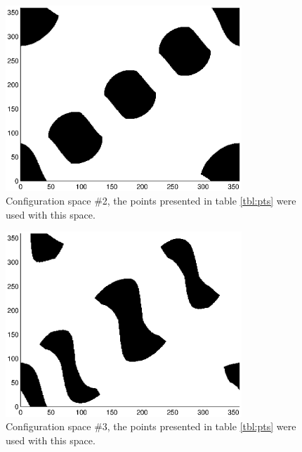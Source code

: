 \begin{figure}[h]
\label{cs2}
	\centering
	\includegraphics[width=3.5in]{./figures/cspace3.eps}
	\caption{Configuration space \#2, the points presented in table \ref{tbl:pts} were used with this space.}
	\label{fig:space2}
\end{figure}

\begin{figure}[h]
\label{cs3}
	\centering
	\includegraphics[width=3.5in]{./figures/cspace4.eps}
	\caption{Configuration space \#3, the points presented in table \ref{tbl:pts} were used with this space.}
	\label{fig:space3}
\end{figure}


